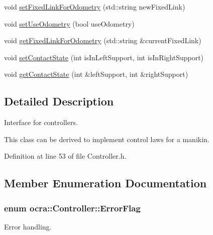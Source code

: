 \begin{DoxyCompactItemize}
\item 
void \hyperlink{classocra_1_1Controller_aac8c56f6b63bb3ae57ac7bf9c23018e8}{set\+Fixed\+Link\+For\+Odometry} (std\+::string new\+Fixed\+Link)
\item 
void \hyperlink{classocra_1_1Controller_a3f6a080793612b0b66e1ce7a26897646}{set\+Use\+Odometry} (bool use\+Odometry)
\item 
void \hyperlink{classocra_1_1Controller_ad134da18dc753e50e6f615373fbf9adf}{get\+Fixed\+Link\+For\+Odometry} (std\+::string \&current\+Fixed\+Link)
\item 
void \hyperlink{classocra_1_1Controller_aa0b365af3cab4a8dc1a3ba3af6a073f0}{set\+Contact\+State} (int is\+In\+Left\+Support, int is\+In\+Right\+Support)
\item 
void \hyperlink{classocra_1_1Controller_a41e0a7fb9fd30c5b58640dd49be10d44}{get\+Contact\+State} (int \&left\+Support, int \&right\+Support)
\end{DoxyCompactItemize}


\subsection{Detailed Description}
Interface for controllers. 

This class can be derived to implement control laws for a manikin. 

Definition at line 53 of file Controller.\+h.



\subsection{Member Enumeration Documentation}
\subsubsection[{\texorpdfstring{Error\+Flag}{ErrorFlag}}]{\setlength{\rightskip}{0pt plus 5cm}enum {\bf ocra\+::\+Controller\+::\+Error\+Flag}}\hypertarget{classocra_1_1Controller_abeaf3673abe2da79493638dcc49fcf6e}{}\label{classocra_1_1Controller_abeaf3673abe2da79493638dcc49fcf6e}


Error handling. 

